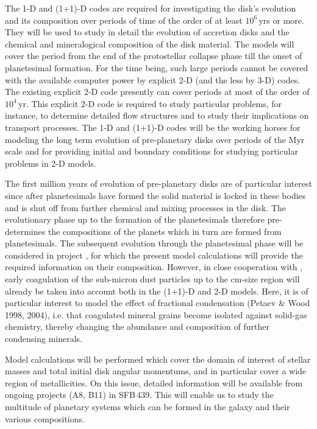 The  1-D and (1+1)-D codes are required for investigating the
disk's evolution and its composition over periods of time of the
order of at least $10^6$\,yrs or more. They will be used to study
in detail the evolution of accretion disks and the chemical and
mineralogical composition of the disk material. The models will
cover the period from the end of the protostellar collapse phase
till the onset of planetesimal formation. For the time being, such
large periods cannot be covered with the available computer power
by explicit 2-D (and the less by 3-D) codes. The existing explicit
2-D code presently can cover periods at most of the order of
$10^4$\,yr. This explicit 2-D code is required to study particular
problems, for instance, to determine detailed flow structures and
to study their implications on transport processes. The 1-D and
(1+1)-D codes will be the working horses for modeling the long
term evolution of pre-planetary disks over periods of the Myr scale
and for providing initial and boundary conditions for studying
particular problems in 2-D models.

The first million years of evolution of pre-planetary disks are of
particular interest since after planetesimals have formed the
solid material is locked in these bodies and is shut off from
further chemical and mixing processes in the disk. The
evolutionary phase up to the formation of the planetesimals
therefore pre-determines the compositions of the planets which in turn are
formed from planetesimals. The subsequent evolution through the planetesimal
phase will be considered in project \projdul, for which the present
model calculations will provide the required information on their
composition. However, in close cooperation with \projdul, early
coagulation of the sub-micron dust particles up to the cm-size region
will already be taken into account both in the (1+1)-D and 2-D models. 
Here, it is of particular interest to model the effect of fractional condensation (Petaev \& Wood 1998, 2004), i.e. that coagulated mineral grains become isolated against solid-gas chemistry, thereby changing the abundance and composition of further condensing minerals.

Model calculations will be performed which cover the domain
of interest of stellar masses and total initial disk angular
momentums, and in particular cover a wide region of
metallicities. On this issue, detailed information will be
available from ongoing projects (A8, B11) in SFB\,439. This will
enable us to study the multitude of planetary systems which can be
formed in the galaxy and their various compositions.

